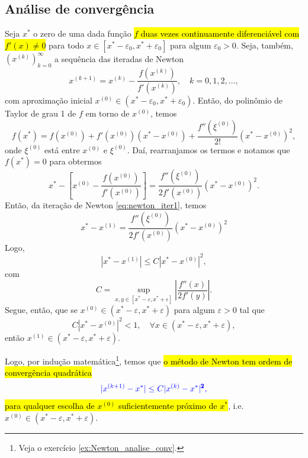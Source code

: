 \subsection{Análise de convergência}

Seja $x^*$ o zero de uma dada função \hl{$f$ duas vezes continuamente diferenciável com $f'(x)\neq 0$} para todo $x\in [x^*-\varepsilon_0, x^*+\varepsilon_0]$ para algum $\varepsilon_0>0$. Seja, também, $(x^{(k)})_{k=0}^\infty$ a sequência das iteradas de Newton
\begin{equation}\label{eq:newton_iter1}
  x^{(k+1)} = x^{(k)} - \frac{f(x^{(k)})}{f'(x^{(k)})},\quad k=0, 1, 2, \ldots,
\end{equation}
com aproximação inicial $x^{(0)}\in (x^*-\varepsilon_0, x^*+\varepsilon_0)$. Então, do polinômio de Taylor de grau 1 de $f$ em torno de $x^{(0)}$, temos
\begin{equation}
  f(x^*) = f(x^{(0)}) + f'(x^{(0)})(x^* - x^{(0)}) + \frac{f''(\xi^{(0)})}{2!}(x^*-x^{(0)})^2,
\end{equation}
onde $\xi^{(0)}$ está entre $x^{(0)}$ e $\xi^{(0)}$. Daí, rearranjamos os termos e notamos que $f(x^*)=0$ para obtermos
\begin{equation}
  x^* - \left[x^{(0)} - \frac{f(x^{(0)})}{f'(x^{(0)})}\right] = \frac{f''(\xi^{(0)})}{2f'(x^{(0)})}(x^*-x^{(0)})^2.
\end{equation}
Então, da iteração de Newton \eqref{eq:newton_iter1}, temos
\begin{equation}
  x^* - x^{(1)} = \frac{f''(\xi^{(0)})}{2f'(x^{(0)})}(x^* - x^{(0)})^2
\end{equation}
Logo,
\begin{equation}\label{eq:newton_taxa_1}
  |x^* - x^{(1)}| \leq C |x^* - x^{(0)}|^2,
\end{equation}
com
\begin{equation}
  C = \sup_{x,y\in [x^*-\varepsilon, x^*+\varepsilon]} \left|\frac{f''(x)}{2f'(y)}\right|.
\end{equation}
Segue, então, que se $x^{(0)}\in (x^*-\varepsilon, x^* + \varepsilon)$ para algum $\varepsilon>0$ tal que
\begin{equation}
  C |x^* - x^{(0)}|^2 < 1,\quad\forall x\in (x^*-\varepsilon, x^* + \varepsilon),
\end{equation}
então $x^{(1)}\in (x^*-\varepsilon, x^*+\varepsilon)$.

Logo, por indução matemática\footnote{Veja o exercício \ref{ex:Newton_analise_conv}.}, temos que \hl{o método de Newton tem ordem de convergência quadrática}
\begin{equation}\label{eq:Newton_taxa_quadratica}
  \color{blue}|x^{(k+1)}-x^*| \leq C|x^{(k)}-x^{*}|^{\pmb{2}},
\end{equation}
\hl{para qualquer escolha de $x^{(0)}$ suficientemente próximo de $x^*$}, i.e. $x^{(0)}\in (x^*-\varepsilon, x^*+\varepsilon)$.

